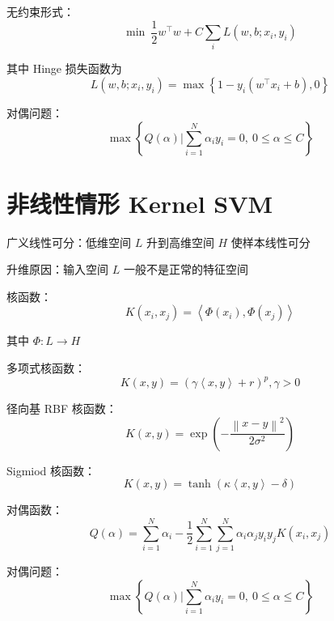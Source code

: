\documentclass[openany]{ctexbook}
\theoremstyle{kaiti}
\theoremstyle{normal}
\begin{document}
无约束形式：
\begin{equation}
  \min~\frac{1}{2}w^{\top}w+C\sum_iL\left(w,b;x_i,y_i \right)
\end{equation}

其中 Hinge 损失函数为
\begin{equation}
  L\left(w,b;x_i,y_i \right)=\max \left\{ 1-y_i\left(w^{\top}x_i+b \right),0 \right\}
\end{equation}

对偶问题：
\begin{equation}
  \max \left\{ Q\left(\alpha \right)|\sum_{i=1}^{N}\alpha_iy_i=0,~0\leqslant \alpha \leqslant C \right\}
\end{equation}

\section{非线性情形 Kernel SVM}

广义线性可分：低维空间 $L$ 升到高维空间 $H$ 使样本线性可分

升维原因：输入空间 $L$ 一般不是正常的特征空间

核函数：
\begin{equation}
  K\left(x_i,x_j \right)=\left< \Phi \left(x_i \right),\Phi \left(x_j \right)\right>
\end{equation}

其中 $\Phi :L\rightarrow H$

多项式核函数：
\begin{equation}
  K\left(x,y \right)=\left(\gamma \left< x,y \right> +r \right)^p, \gamma >0
\end{equation}

径向基 RBF 核函数：
\begin{equation}
  K\left(x,y \right)=\exp \left(-\frac{\left\| x-y \right\|^2}{2\sigma^2}\right)
\end{equation}

Sigmiod 核函数：
\begin{equation}
  K\left(x,y \right)=\tanh \left(\kappa \left< x,y \right> -\delta \right)
\end{equation}

对偶函数：
\begin{equation}
  Q\left(\alpha \right)=\sum_{i=1}^{N}\alpha_i-\frac{1}{2}\sum_{i=1}^{N}\sum_{j=1}^{N}\alpha_i\alpha_jy_iy_jK\left(x_i,x_j \right)
\end{equation}

对偶问题：
\begin{equation}
  \max \left\{ Q\left(\alpha \right)|\sum_{i=1}^{N}\alpha_iy_i=0,~0\leqslant \alpha \leqslant C \right\}
\end{equation}
\end{document}

